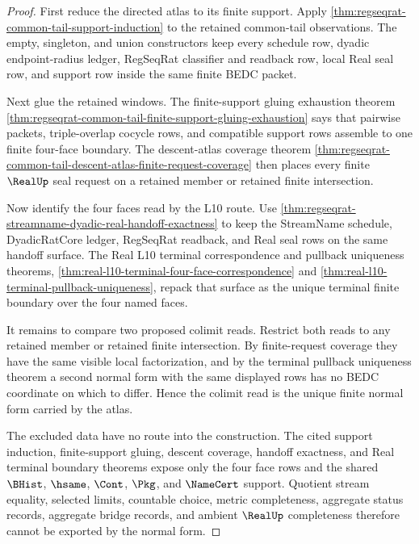 \begin{proof}
First reduce the directed atlas to its finite support. Apply \autoref{thm:regseqrat-common-tail-support-induction} to the retained common-tail observations. The empty, singleton, and union constructors keep every schedule row, dyadic endpoint-radius ledger, RegSeqRat classifier and readback row, local Real seal row, and support row inside the same finite BEDC packet.

Next glue the retained windows. The finite-support gluing exhaustion theorem \autoref{thm:regseqrat-common-tail-finite-support-gluing-exhaustion} says that pairwise packets, triple-overlap cocycle rows, and compatible support rows assemble to one finite four-face boundary. The descent-atlas coverage theorem \autoref{thm:regseqrat-common-tail-descent-atlas-finite-request-coverage} then places every finite $\RealUp$ seal request on a retained member or retained finite intersection.

Now identify the four faces read by the L10 route. Use \autoref{thm:regseqrat-streamname-dyadic-real-handoff-exactness} to keep the StreamName schedule, DyadicRatCore ledger, RegSeqRat readback, and Real seal rows on the same handoff surface. The Real L10 terminal correspondence and pullback uniqueness theorems, \autoref{thm:real-l10-terminal-four-face-correspondence} and \autoref{thm:real-l10-terminal-pullback-uniqueness}, repack that surface as the unique terminal finite boundary over the four named faces.

It remains to compare two proposed colimit reads. Restrict both reads to any retained member or retained finite intersection. By finite-request coverage they have the same visible local factorization, and by the terminal pullback uniqueness theorem a second normal form with the same displayed rows has no BEDC coordinate on which to differ. Hence the colimit read is the unique finite normal form carried by the atlas.

The excluded data have no route into the construction. The cited support induction, finite-support gluing, descent coverage, handoff exactness, and Real terminal boundary theorems expose only the four face rows and the shared $\BHist$, $\hsame$, $\Cont$, $\Pkg$, and $\NameCert$ support. Quotient stream equality, selected limits, countable choice, metric completeness, aggregate status records, aggregate bridge records, and ambient $\RealUp$ completeness therefore cannot be exported by the normal form.
\end{proof}

